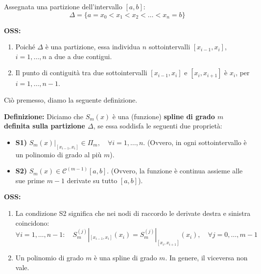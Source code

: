 Assegnata una partizione dell'intervallo $[a,b]$:
\begin{equation} \label{eq:partizione}
\Delta = \{a = x_0 < x_1 < x_2 < \dots < x_n = b\}
\end{equation}

\textbf{OSS:} 
\begin{enumerate}
    \item Poiché $\Delta$ è una partizione, essa individua $n$ sottointervalli $[x_{i-1}, x_i]$, $i=1, \dots, n$ a due a due contigui.
    \item Il punto di contiguità tra due sottointervalli $[x_{i-1}, x_i]$ e $[x_i, x_{i+1}]$ è $x_i$, per $i=1, \dots, n-1$.
\end{enumerate}

\begin{center}
\end{center}

Ciò premesso, diamo la seguente definizione.

\textbf{Definizione:} Diciamo che $S_m(x)$ è una (funzione) \textbf{spline di grado $m$ definita sulla partizione $\Delta$}, se essa soddisfa le seguenti due proprietà:
\begin{itemize}
    \item \textbf{S1)} $S_m(x)|_{[x_{i-1}, x_i]} \in \Pi_m, \quad \forall i=1, \dots, n$. (Ovvero, in ogni sottointervallo è un polinomio di grado al più $m$).
    \item \textbf{S2)} $S_m(x) \in \mathcal{C}^{(m-1)}[a,b]$. (Ovvero, la funzione è continua assieme alle sue prime $m-1$ derivate su tutto $[a,b]$).
\end{itemize}

\textbf{OSS:} 
\begin{enumerate}
    \item La condizione S2 significa che nei nodi di raccordo le derivate destra e sinistra coincidono:
    $$\forall i=1, \dots, n-1 : \quad S_m^{(j)}|_{[x_{i-1}, x_i]}(x_i) = S_m^{(j)}|_{[x_i, x_{i+1}]}(x_i), \quad \forall j=0, \dots, m-1$$
    \item Un polinomio di grado $m$ è una spline di grado $m$. In genere, il viceversa non vale.
\end{enumerate}


